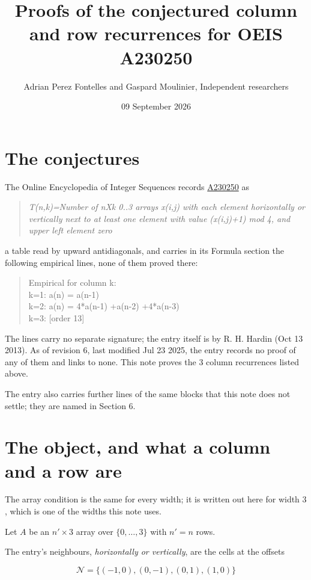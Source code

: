 \documentclass[11pt]{article}
\title{Proofs of the conjectured column and row recurrences for OEIS A230250}
\author{Adrian Perez Fontelles and Gaspard Moulinier, Independent researchers}
\date{09 September 2026}
\theoremstyle{definition}
\begin{document}
\maketitle
\section{The conjectures}

The Online Encyclopedia of Integer Sequences records \href{https://oeis.org/A230250}{A230250} as

\begin{quote}\itshape T(n,k)=Number of nXk 0..3 arrays x(i,j) with each element horizontally or vertically next to at least one element with value (x(i,j)+1) mod 4, and upper left element zero\end{quote}

a table read by upward antidiagonals, and carries in its Formula section the following empirical lines, none of them proved there:

\begin{quote}\ttfamily Empirical for column k:\\
k=1: a(n) = a(n-1)\\k=2: a(n) = 4*a(n-1) +a(n-2) +4*a(n-3)\\k=3: [order 13]\end{quote}

The lines carry no separate signature; the entry itself is by R. H. Hardin (Oct 13 2013). As of revision 6, last modified Jul 23 2025, the entry records no proof of any of them and links to none. This note proves the 3 column recurrences listed above.

The entry also carries further lines of the same blocks that this note does not settle; they are named in Section 6.

\section{The object, and what a column and a row are}

The array condition is the same for every width; it is written out here for width $3$, which is one of the widths this note uses.

Let $A$ be an $n' \times 3$ array over $\{0,\dots,3\}$ with $n' = n$ rows.

The entry's neighbours, {\itshape horizontally or vertically}, are the cells at the offsets

\[\mathcal{N} = \{(-1,0), (0,-1), (0,1), (1,0)\}\]
\end{document}
